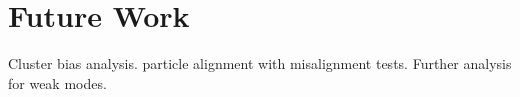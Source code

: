\chapter{Future Work}
\label{sec:future}

Cluster bias analysis. particle alignment with misalignment tests.
Further analysis for weak modes.
